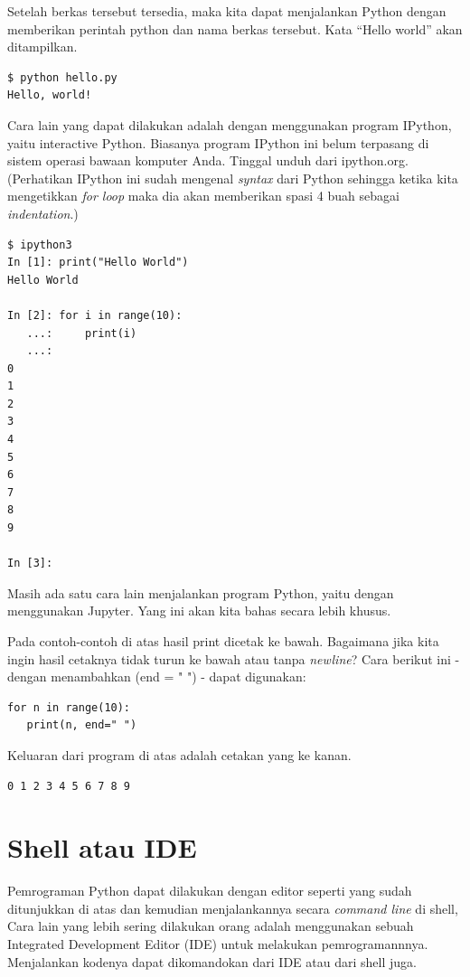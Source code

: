 Setelah berkas tersebut tersedia, maka kita dapat menjalankan Python dengan
memberikan perintah python dan nama berkas tersebut. 
Kata ``Hello world'' akan ditampilkan.

\begin{verbatim}
$ python hello.py
Hello, world!
\end{verbatim}

Cara lain yang dapat dilakukan adalah dengan menggunakan program IPython,
yaitu interactive Python. Biasanya program IPython ini belum terpasang di
sistem operasi bawaan komputer Anda. Tinggal unduh dari ipython.org.
(Perhatikan IPython ini sudah mengenal {\em syntax} dari Python sehingga 
ketika kita mengetikkan {\em for loop} maka dia akan memberikan spasi 4 buah
sebagai {\em indentation}.)

\begin{verbatim}
$ ipython3
In [1]: print("Hello World")
Hello World

In [2]: for i in range(10):
   ...:     print(i)
   ...:     
0
1
2
3
4
5
6
7
8
9

In [3]: 
\end{verbatim}

Masih ada satu cara lain menjalankan program Python, yaitu dengan menggunakan
Jupyter. Yang ini akan kita bahas secara lebih khusus.

Pada contoh-contoh di atas hasil print dicetak ke bawah. Bagaimana jika kita
ingin hasil cetaknya tidak turun ke bawah atau tanpa {\em newline}?
Cara berikut ini - dengan menambahkan (end = " ") - dapat digunakan:

\begin{verbatim}
for n in range(10):
   print(n, end=" ")
\end{verbatim}
Keluaran dari program di atas adalah cetakan yang ke kanan.
\begin{verbatim}
0 1 2 3 4 5 6 7 8 9
\end{verbatim}


\section{Shell atau IDE}
Pemrograman Python dapat dilakukan dengan editor seperti yang sudah ditunjukkan
di atas dan kemudian menjalankannya secara {\em command line} di shell,
Cara lain yang lebih sering dilakukan orang adalah menggunakan sebuah
Integrated Development Editor (IDE) untuk melakukan pemrogramannnya.
Menjalankan kodenya dapat dikomandokan dari IDE atau dari shell juga.

